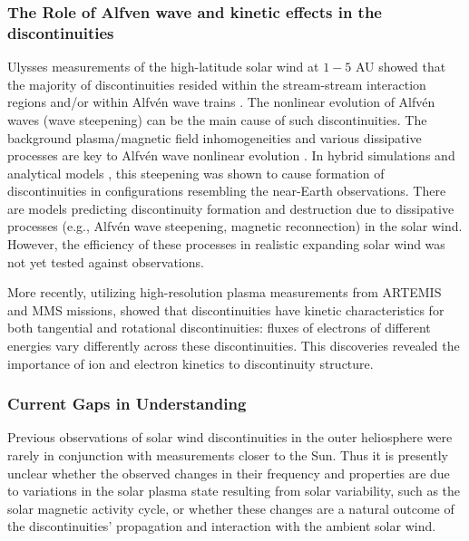 \documentclass[
  letterpaper,
  DIV=11,
  numbers=noendperiod]{scrartcl}
\begin{document}
\subsubsection{The Role of Alfven wave and kinetic effects in the discontinuities}\label{the-role-of-alfven-wave-and-kinetic-effects-in-the-discontinuities}

Ulysses measurements of the high-latitude solar wind at \(1-5\) AU showed that the majority of discontinuities resided within the stream-stream interaction regions and/or within Alfvén wave trains \citep{tsurutaniInterplanetaryDiscontinuitiesAlfven1995, tsurutaniReviewDiscontinuitiesAlfven1999}. The nonlinear evolution of Alfvén waves (wave steepening) can be the main cause of such discontinuities. The background plasma/magnetic field inhomogeneities and various dissipative processes are key to Alfvén wave nonlinear evolution \citep{Lerche75, Prakash&Diamond99, Medvedev97:prl, Nariyuki14, Yang15}. In hybrid simulations \citep[see][]{Vasquez&Hollweg98, Vasquez&Hollweg01, TenBarge&Howes13} and analytical models \citep[e.g.,][]{Kennel88:jetp, Hada89, Malkov91, Wu&Kennel92, Medvedev97:pop}, this steepening was shown to cause formation of discontinuities in configurations resembling the near-Earth observations. There are models predicting discontinuity formation \citep{Servidio15, Podesta&Roytershteyn17} and destruction \citep{Servidio11,Matthaeus15} due to dissipative processes (e.g., Alfvén wave steepening, magnetic reconnection) in the solar wind. However, the efficiency of these processes in realistic expanding solar wind was not yet tested against observations.

More recently, utilizing high-resolution plasma measurements from ARTEMIS and MMS missions, \citet{artemyevKineticNatureSolar2019} showed that discontinuities have kinetic characteristics for both tangential and rotational discontinuities: fluxes of electrons of different energies vary differently across these discontinuities. This discoveries revealed the importance of ion and electron kinetics to discontinuity structure.

\subsubsection{Current Gaps in Understanding}\label{current-gaps-in-understanding}

Previous observations of solar wind discontinuities in the outer heliosphere were rarely in conjunction with measurements closer to the Sun. Thus it is presently unclear whether the observed changes in their frequency and properties are due to variations in the solar plasma state resulting from solar variability, such as the solar magnetic activity cycle, or whether these changes are a natural outcome of the discontinuities' propagation and interaction with the ambient solar wind.
\end{document}
